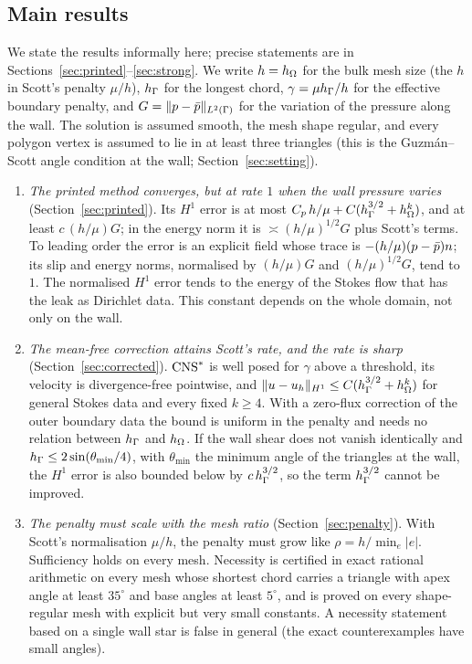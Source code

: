 \subsection{Main results}
We state the results informally here; precise statements are in Sections~\ref{sec:printed}--\ref{sec:strong}. We write $h=h_\Omega$ for the bulk mesh size (the $h$ in Scott's penalty $\mu/h$), $h_\Gamma$ for the longest chord, $\gamma=\mu h_\Gamma/h$ for the effective boundary penalty, and $G=\lVert p-\bar p\rVert_{L^2(\Gamma)}$ for the variation of the pressure along the wall. The solution is assumed smooth, the mesh shape regular, and every polygon vertex is assumed to lie in at least three triangles (this is the Guzm\'an--Scott angle condition at the wall; Section~\ref{sec:setting}).
\begin{enumerate}[label=(\arabic*)]
\item \emph{The printed method converges, but at rate $1$ when the wall pressure varies} (Section~\ref{sec:printed}). Its $H^1$ error is at most $C_p\,h/\mu+C(h_\Gamma^{3/2}+h_\Omega^k)$, and at least $c\,(h/\mu)G$; in the energy norm it is $\asymp(h/\mu)^{1/2}G$ plus Scott's terms. To leading order the error is an explicit field whose trace is $-(h/\mu)(p-\bar p)n$; its slip and energy norms, normalised by $(h/\mu)G$ and $(h/\mu)^{1/2}G$, tend to $1$. The normalised $H^1$ error tends to the energy of the Stokes flow that has the leak as Dirichlet data. This constant depends on the whole domain, not only on the wall.
\item \emph{The mean-free correction attains Scott's rate, and the rate is sharp} (Section~\ref{sec:corrected}). $\mathrm{CNS}^\ast$ is well posed for $\gamma$ above a threshold, its velocity is divergence-free pointwise, and $\lVert u-u_h\rVert_{H^1}\le C(h_\Gamma^{3/2}+h_\Omega^k)$ for general Stokes data and every fixed $k\ge4$. With a zero-flux correction of the outer boundary data the bound is uniform in the penalty and needs no relation between $h_\Gamma$ and $h_\Omega$. If the wall shear does not vanish identically and $h_\Gamma\le2\sin(\theta_{\min}/4)$, with $\theta_{\min}$ the minimum angle of the triangles at the wall, the $H^1$ error is also bounded below by $c\,h_\Gamma^{3/2}$, so the term $h_\Gamma^{3/2}$ cannot be improved.
\item \emph{The penalty must scale with the mesh ratio} (Section~\ref{sec:penalty}). With Scott's normalisation $\mu/h$, the penalty must grow like $\rho=h/\min_e|e|$. Sufficiency holds on every mesh. Necessity is certified in exact rational arithmetic on every mesh whose shortest chord carries a triangle with apex angle at least $35^\circ$ and base angles at least $5^\circ$, and is proved on every shape-regular mesh with explicit but very small constants. A necessity statement based on a single wall star is false in general (the exact counterexamples have small angles).

\end{enumerate}
